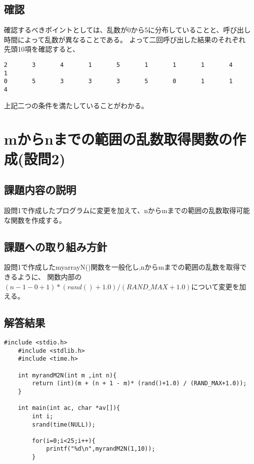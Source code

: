 \documentclass[fontsize = 10pt, paper= a4]{jlreq}
\begin{document}
\subsection{確認}
確認するべきポイントとしては、乱数が0から5に分布していることと、呼び出し時間によって乱数が異なることである。
よって二回呼び出した結果のそれぞれ先頭10項を確認すると、
\begin{lstlisting}[basicstyle=\ttfamily\footnotesize, frame=single, caption=s2212022-1.out ,label=s2212022-1.out]
2       3       4       1       5       1       1       1       4       1      
0       5       3       3       3       5       0       1       1       4     
\end{lstlisting}
上記二つの条件を満たしていることがわかる。

\section{mからnまでの範囲の乱数取得関数の作成(設問2)}
\subsection{課題内容の説明}
設問1で作成したプログラムに変更を加えて、nからmまでの範囲の乱数取得可能な関数を作成する。
\subsection{課題への取り組み方針}
設問1で作成したmyarrayN()関数を一般化し,nからmまでの範囲の乱数を取得できるように、
関数内部の$ (n-1 -0 + 1) * (rand()+1.0) / (RAND\_MAX+1.0) $について変更を加える。


\subsection{解答結果}

\begin{lstlisting}[basicstyle=\ttfamily\footnotesize, frame=single, caption=s2212022-2.c ,label=s2212022-2.c]
    #include <stdio.h>
    #include <stdlib.h>
    #include <time.h>
    
    int myrandM2N(int m ,int n){
        return (int)(m + (n + 1 - m)* (rand()+1.0) / (RAND_MAX+1.0));
    }
    
    int main(int ac, char *av[]){
        int i;
        srand(time(NULL));
    
        for(i=0;i<25;i++){
            printf("%d\n",myrandM2N(1,10));
        }
\end{lstlisting}
\end{document}
